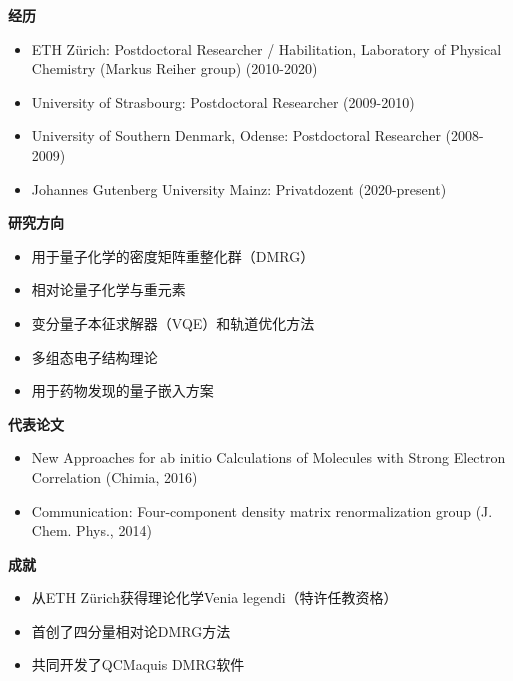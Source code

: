 \par{\footnotesize\color{mainred}\textbf{经历}}
\begin{itemize}[leftmargin=1.2em,itemsep=0pt,topsep=0pt]
\item {\footnotesize ETH Zürich: Postdoctoral Researcher / Habilitation, Laboratory of Physical Chemistry (Markus Reiher group) (2010-2020)}
\item {\footnotesize University of Strasbourg: Postdoctoral Researcher (2009-2010)}
\item {\footnotesize University of Southern Denmark, Odense: Postdoctoral Researcher (2008-2009)}
\item {\footnotesize Johannes Gutenberg University Mainz: Privatdozent (2020-present)}
\end{itemize}
\par{\footnotesize\color{mainred}\textbf{研究方向}}
\begin{itemize}[leftmargin=1.2em,itemsep=0pt,topsep=0pt]
\item {\footnotesize 用于量子化学的密度矩阵重整化群（DMRG）}
\item {\footnotesize 相对论量子化学与重元素}
\item {\footnotesize 变分量子本征求解器（VQE）和轨道优化方法}
\item {\footnotesize 多组态电子结构理论}
\item {\footnotesize 用于药物发现的量子嵌入方案}
\end{itemize}
\par{\footnotesize\color{mainred}\textbf{代表论文}}
\begin{itemize}[leftmargin=1.2em,itemsep=0pt,topsep=0pt]
\item {\footnotesize New Approaches for ab initio Calculations of Molecules with Strong Electron Correlation (Chimia, 2016)}
\item {\footnotesize Communication: Four-component density matrix renormalization group (J. Chem. Phys., 2014)}
\end{itemize}
\par{\footnotesize\color{mainred}\textbf{成就}}
\begin{itemize}[leftmargin=1.2em,itemsep=0pt,topsep=0pt]
\item {\footnotesize 从ETH Zürich获得理论化学Venia legendi（特许任教资格）}
\item {\footnotesize 首创了四分量相对论DMRG方法}
\item {\footnotesize 共同开发了QCMaquis DMRG软件}
\end{itemize}
